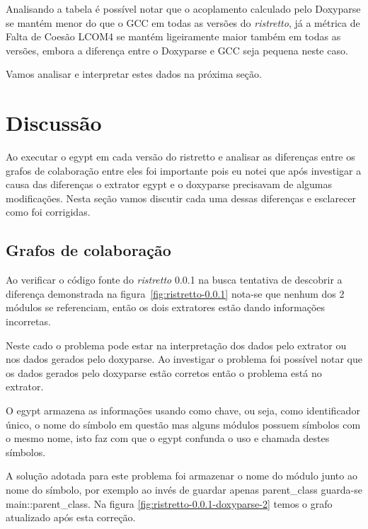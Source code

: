Analisando a tabela é possível notar que o acoplamento calculado pelo Doxyparse
se mantém menor do que o GCC em todas as versões do {\it ristretto}, já a métrica de
Falta de Coesão LCOM4 se mantém ligeiramente maior também em todas as versões,
embora a diferença entre o Doxyparse e GCC seja pequena neste caso.

Vamos analisar e interpretar estes dados na próxima seção.

\section{Discussão} \label{sec:discussao}

Ao executar o egypt em cada versão do ristretto e analisar as diferenças entre
os grafos de colaboração entre eles foi importante pois eu notei que após
investigar a causa das diferenças o extrator egypt e o doxyparse precisavam de
algumas modificações. Nesta seção vamos discutir cada uma dessas diferenças e
esclarecer como foi corrigidas.

\subsection{Grafos de colaboração}

Ao verificar o código fonte do {\it ristretto} 0.0.1 na busca tentativa de descobrir a diferença demonstrada na figura~\ref{fig:ristretto-0.0.1} 
nota-se que nenhum dos 2 módulos se referenciam, então os dois extratores estão dando informações incorretas.

Neste cado o problema pode estar na interpretação dos dados pelo extrator ou nos dados
gerados pelo doxyparse. Ao investigar o problema foi possível notar que os
dados gerados pelo doxyparse estão corretos então o problema está no extrator.

O egypt armazena as informações usando como chave, ou seja, como identificador
único, o nome do símbolo em questão mas alguns módulos possuem símbolos com o
mesmo nome, isto faz com que o egypt confunda o uso e chamada destes símbolos.

A solução adotada para este problema foi armazenar o nome do módulo junto ao
nome do símbolo, por exemplo ao invés de guardar apenas parent\_class guarda-se
main::parent\_class. Na figura \ref{fig:ristretto-0.0.1-doxyparse-2} temos o
grafo atualizado após esta correção.

